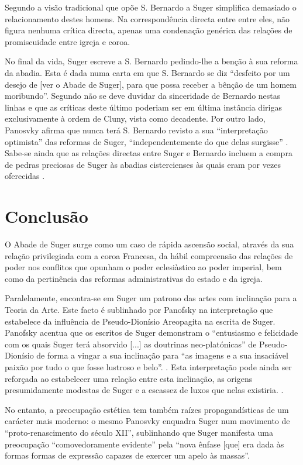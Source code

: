 \documentclass{article}
\begin{document}
Segundo \cite{calado} a visão tradicional que opõe S. Bernardo a Suger
simplifica demasiado o relacionamento destes homens. Na
correspondência directa entre entre eles, não figura nenhuma crítica
directa, apenas uma condenação genérica das relações de promiscuidade
entre igreja e coroa.

No final da vida, Suger escreve a S. Bernardo pedindo-lhe a benção à
sua reforma da abadia. Esta é dada numa carta em que S. Bernardo se
diz ``desfeito por um desejo de [ver o Abade de Suger], para que possa
receber a bênção de um homem moribundo''. Segundo \cite{jago-suger}
não se deve duvidar da sinceridade de Bernardo nestas linhas e que as
críticas deste último poderiam ser em última instância dirigas
exclusivamente à ordem de Cluny, vista como decadente. Por outro lado,
Panosvky afirma que nunca terá S. Bernardo revisto a sua
``interpretação optimista'' das reformas de Suger, ``independentemente
do que delas surgisse'' \cite{panofsky-suger}. Sabe-se ainda que as
relações directas entre Suger e Bernardo incluem a compra de pedras
preciosas de Suger às abadias cistercienses às quais eram por vezes
oferecidas \cite{calado}.

\section{Conclusão}

O Abade de Suger surge como um caso de rápida ascensão social, através
da sua relação privilegiada com a coroa Francesa, da hábil compreensão
das relações de poder nos conflitos que opunham o poder eclesiàstico
ao poder imperial, bem como da pertinência das reformas
administrativas do estado e da igreja.

Paralelamente, encontra-se em Suger um patrono das artes com
inclinação para a Teoria da Arte. Este facto é sublinhado por Panofsky
na interpretação que estabelece da influência de Pseudo-Dionísio
Areopagita na escrita de Suger. Panofsky acentua que os escritos de
Suger demonstram o ``entusiasmo e felicidade com os quais Suger terá
absorvido [...]  as doutrinas neo-platónicas'' de Pseudo-Dionísio de
forma a vingar a sua inclinação para ``as imagens e a sua insaciável
paixão por tudo o que fosse lustroso e
belo''. \cite{panofsky-suger}. Esta interpretação pode ainda ser
reforçada ao estabelecer uma relação entre esta inclinação, as origens
presumidamente modestas de Suger e a escassez de luxos que nelas
existiria. \cite{calado}.

No entanto, a preocupação estética tem também raízes propagandísticas
de um carácter mais moderno: o mesmo Panosvky
\cite{panofsky-renascimento} enquadra Suger num movimento de
``proto-renascimento do século XII'', sublinhando que Suger manifesta
uma preocupação ``comovedoramente evidente'' pela ``nova ênfase [que]
era dada às formas formas de expressão capazes de exercer um apelo às
massas''.

\printbibliography[heading=bibliography,title={Bibliografia}]
\end{document}
